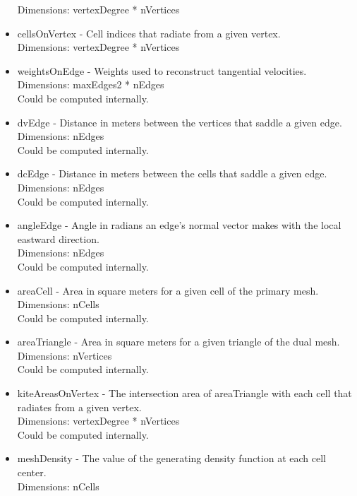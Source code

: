 \documentclass[11pt]{report}
\begin{document}
\begin{itemize}
		  Dimensions: vertexDegree * nVertices
	\item cellsOnVertex - Cell indices that radiate from a given vertex. \\
		  Dimensions: vertexDegree * nVertices
	\item weightsOnEdge - Weights used to reconstruct tangential velocities. \\
		  Dimensions: maxEdges2 * nEdges \\
		  Could be computed internally. 
	\item dvEdge - Distance in meters between the vertices that saddle a given edge. \\
		  Dimensions: nEdges \\
		  Could be computed internally. 
	\item dcEdge - Distance in meters between the cells that saddle a given edge. \\
		  Dimensions: nEdges \\
		  Could be computed internally. 
	\item angleEdge - Angle in radians an edge's normal vector makes with the local eastward direction. \\
		  Dimensions: nEdges \\
		  Could be computed internally. 
	\item areaCell - Area in square meters for a given cell of the primary mesh. \\
		  Dimensions: nCells \\
		  Could be computed internally. 
	\item areaTriangle - Area in square meters for a given triangle of the dual mesh. \\
		  Dimensions: nVertices \\
		  Could be computed internally. 
	\item kiteAreasOnVertex - The intersection area of areaTriangle with each cell that radiates from a given vertex. \\
		  Dimensions: vertexDegree * nVertices \\
		  Could be computed internally. 
	\item meshDensity - The value of the generating density function at each cell center. \\
		  Dimensions: nCells
\end{itemize}
\end{document}
